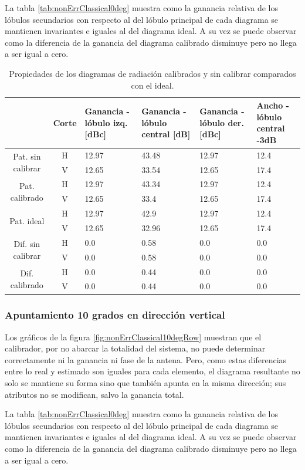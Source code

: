 La tabla \ref{tab:nonErrClassical0deg} muestra como la ganancia relativa de los lóbulos secundarios con respecto al del lóbulo
principal de cada diagrama se mantienen invariantes e iguales al del diagrama ideal. A su vez se puede observar como la diferencia
de la ganancia del diagrama calibrado disminuye pero no llega a ser igual a cero.
\begin{table}[H]
  \footnotesize
  \centering
  \begin{tabular}{|c|c|p{2cm}|p{2.5cm}|p{2.5cm}|p{2.5cm}|}
    \cline{2-6}
    \multicolumn{1}{c|}{} & Corte & Ganancia - lóbulo izq. [dBc] & Ganancia - lóbulo central [dB] &
    Ganancia - lóbulo der. [dBc] & Ancho - lóbulo central -3dB \tabularnewline\hline
    \multirow{2}{2cm}{Pat. sin calibrar} & H & 12.97 & 43.48 & 12.97 & 12.4 \tabularnewline\cline{2-6}
     & V & 12.65 & 33.54 & 12.65 & 17.4 \tabularnewline\hline
    \multirow{2}{2cm}{Pat. calibrado} & H & 12.97 & 43.34 & 12.97 & 12.4 \tabularnewline\cline{2-6}
     & V & 12.65 & 33.4 & 12.65 & 17.4 \tabularnewline\hline
    \multirow{2}{2cm}{Pat. ideal} & H & 12.97 & 42.9 & 12.97 & 12.4 \tabularnewline\cline{2-6}
     & V & 12.65 & 32.96 & 12.65 & 17.4 \tabularnewline\hline
    \multirow{2}{2cm}{Dif. sin calibrar} & H & 0.0 & 0.58 & 0.0 & 0.0\tabularnewline\cline{2-6}
     & V & 0.0 & 0.58 & 0.0 & 0.0 \tabularnewline\hline
    \multirow{2}{2cm}{Dif. calibrado} & H & 0.0 & 0.44 & 0.0 & 0.0 \tabularnewline\cline{2-6}
     & V & 0.0 & 0.44 & 0.0 & 0.0 \tabularnewline\hline
  \end{tabular}
  \caption{Propiedades de los diagramas de radiación calibrados y sin calibrar comparados con el ideal.}
  \label{tab:nonErrClassical10degCol}
\end{table}


\subsubsection{Apuntamiento 10 grados en dirección vertical}

Los gráficos de la figura \ref{fig:nonErrClassical10degRow} muestran que el calibrador, por no abarcar la totalidad del sistema,
no puede determinar correctamente ni la ganancia ni fase de la antena. Pero, como estas diferencias entre lo real y estimado son
iguales para cada elemento, el diagrama resultante no solo se mantiene su forma sino que también apunta en la misma dirección; 
sus atributos no se modifican, salvo la ganancia total.

La tabla \ref{tab:nonErrClassical0deg} muestra como la ganancia relativa de los lóbulos secundarios con respecto al del lóbulo
principal de cada diagrama se mantienen invariantes e iguales al del diagrama ideal. A su vez se puede observar como la diferencia
de la ganancia del diagrama calibrado disminuye pero no llega a ser igual a cero.

